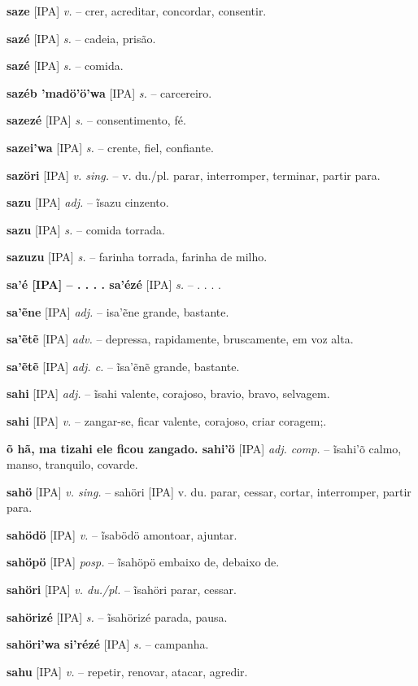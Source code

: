 {\textbf{saze} [IPA] \textit{v.} -- crer, acreditar, concordar, consentir.

\textbf{sazé} [IPA] \textit{s.} -- cadeia, prisão.

\textbf{sazé} [IPA] \textit{s.} -- comida.

\textbf{sazéb 'madö'ö'wa} [IPA] \textit{s.} -- carcereiro.

\textbf{sazezé} [IPA] \textit{s.} -- consentimento, fé.

\textbf{sazei'wa} [IPA] \textit{s.} -- crente, fiel, confiante.

\textbf{sazöri} [IPA] \textit{v. sing.} -- v. du./pl. parar, interromper, terminar, partir para.

\textbf{sazu} [IPA] \textit{adj.} -- ĩsazu cinzento.

\textbf{sazu} [IPA] \textit{s.} -- comida torrada.

\textbf{sazuzu} [IPA] \textit{s.} -- farinha torrada, farinha de milho.

\textbf{sa'é [IPA]  -- . . . . sa'ézé} [IPA] \textit{s.} -- . . . .

\textbf{sa'ẽne} [IPA] \textit{adj.} -- isa'ẽne grande, bastante.

\textbf{sa'ẽtẽ} [IPA] \textit{adv.} -- depressa, rapidamente, bruscamente, em voz alta.

\textbf{sa'ẽtẽ} [IPA] \textit{adj. c.} -- ĩsa'ẽnẽ grande, bastante.

\textbf{sahi} [IPA] \textit{adj.} -- ĩsahi valente, corajoso, bravio, bravo, selvagem.

\textbf{sahi} [IPA] \textit{v.} -- zangar-se, ficar valente, corajoso, criar coragem;.

\textbf{õ hã, ma tizahi ele ficou zangado. sahi'ö} [IPA] \textit{adj. comp.} -- ĩsahi'õ calmo, manso, tranquilo, covarde.

\textbf{sahö} [IPA] \textit{v. sing.} -- sahöri [IPA] v. du. parar, cessar, cortar, interromper, partir para.

\textbf{sahödö} [IPA] \textit{v.} -- ĩsabödö amontoar, ajuntar.

\textbf{sahöpö} [IPA] \textit{posp.} -- ĩsahöpö embaixo de, debaixo de.

\textbf{sahöri} [IPA] \textit{v. du./pl.} -- ĩsahöri parar, cessar.

\textbf{sahörizé} [IPA] \textit{s.} -- ĩsahörizé parada, pausa.

\textbf{sahöri'wa si'rézé} [IPA] \textit{s.} -- campanha.

\textbf{sahu} [IPA] \textit{v.} -- repetir, renovar, atacar, agredir.

}
